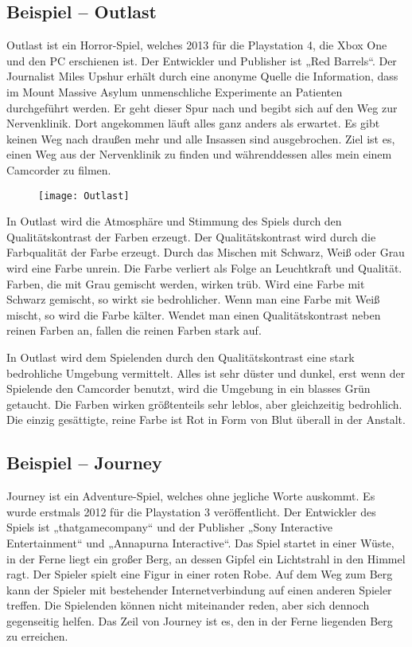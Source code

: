 \subsection{Beispiel – Outlast}
Outlast ist ein Horror-Spiel, welches 2013 für die Playstation 4, die Xbox One und den PC erschienen ist. Der Entwickler und Publisher ist „Red Barrels“. Der Journalist Miles Upshur erhält durch eine anonyme Quelle die Information, dass im Mount Massive Asylum unmenschliche Experimente an Patienten durchgeführt werden. Er geht dieser Spur nach und begibt sich auf den Weg zur Nervenklinik. Dort angekommen läuft alles ganz anders als erwartet. Es gibt keinen Weg nach draußen mehr und alle Insassen sind ausgebrochen. Ziel ist es, einen Weg aus der Nervenklinik zu finden und währenddessen alles mein einem Camcorder zu filmen. 

\begin{figure}[H]
	\centering
	\texttt{[image: Outlast]}
	\caption{\cite{solarski2012drawing}}
\end{figure}

In Outlast wird die Atmosphäre und Stimmung des Spiels durch den Qualitätskontrast der Farben erzeugt. Der Qualitätskontrast wird durch die Farbqualität der Farbe erzeugt. Durch das Mischen mit Schwarz, Weiß oder Grau wird eine Farbe unrein. Die Farbe verliert als Folge an Leuchtkraft und Qualität. Farben, die mit Grau gemischt werden, wirken trüb. Wird eine Farbe mit Schwarz gemischt, so wirkt sie bedrohlicher. Wenn man eine Farbe mit Weiß mischt, so wird die Farbe kälter. Wendet man einen Qualitätskontrast neben reinen Farben an, fallen die reinen Farben stark auf.

In Outlast wird dem Spielenden durch den Qualitätskontrast eine stark bedrohliche Umgebung vermittelt. Alles ist sehr düster und dunkel, erst wenn der Spielende den Camcorder benutzt, wird die Umgebung in ein blasses Grün getaucht. Die Farben wirken größtenteils sehr leblos, aber gleichzeitig bedrohlich. Die einzig gesättigte, reine Farbe ist Rot in Form von Blut überall in der Anstalt. 

\subsection{Beispiel – Journey}
Journey ist ein Adventure-Spiel, welches ohne jegliche Worte auskommt. Es wurde erstmals 2012 für die Playstation 3 veröffentlicht. Der Entwickler des Spiels ist „thatgamecompany“ und der Publisher „Sony Interactive Entertainment“ und „Annapurna Interactive“. Das Spiel startet in einer Wüste, in der Ferne liegt ein großer Berg, an dessen Gipfel ein Lichtstrahl in den Himmel ragt. Der Spieler spielt eine Figur in einer roten Robe. Auf dem Weg zum Berg kann der Spieler mit bestehender Internetverbindung auf einen anderen Spieler treffen. Die Spielenden können nicht miteinander reden, aber sich dennoch gegenseitig helfen. Das Zeil von Journey ist es, den in der Ferne liegenden Berg zu erreichen. 
\cite{solarski2012drawing}

